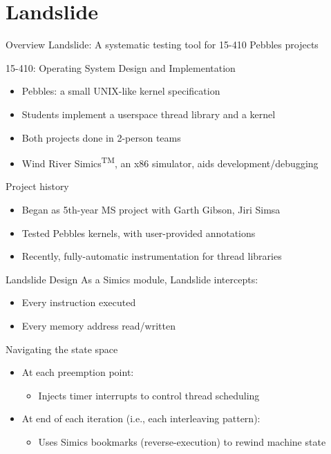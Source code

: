 \documentclass[xcolor=dvipsnames]{beamer}
\begin{document}
\section{Landslide}


\begin{frame}{Overview}
	Landslide: A systematic testing tool for 15-410 Pebbles projects
	\linegap

	15-410: Operating System Design and Implementation
	\begin{itemize}
		\item Pebbles: a small UNIX-like kernel specification
		\item Students implement a userspace thread library and a kernel
		\item Both projects done in 2-person teams
		\item Wind River Simics\textsuperscript{TM}, an x86 simulator, aids development/debugging
	\end{itemize}
	\pause
	\linegap

	Project history
	\begin{itemize}
		\item Began as 5th-year MS project with Garth Gibson, Jiri Simsa
		\item Tested Pebbles kernels, with user-provided annotations
		\item Recently, fully-automatic instrumentation for thread libraries
	\end{itemize}
\end{frame}

\begin{frame}{Landslide Design}
	As a Simics module, Landslide intercepts:
	\begin{itemize}
		\item Every instruction executed
		\item Every memory address read/written
	\end{itemize}
	\pause
	\linegap

	Navigating the state space
	\begin{itemize}
		\item At each preemption point:
		\begin{itemize}
			\item Injects timer interrupts to control thread scheduling
		\end{itemize}
		\item At end of each iteration (i.e., each interleaving pattern):
		\begin{itemize}
			\item Uses Simics bookmarks (reverse-execution) to rewind machine state
		\end{itemize}
	\end{itemize}
\end{frame}
\end{document}
